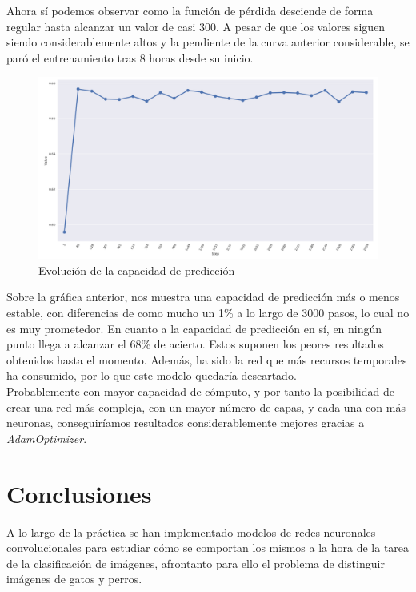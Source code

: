 \documentclass[11pt]{article}
\theoremstyle{plain}
\theoremstyle{definition}
\begin{document}
Ahora sí podemos observar como la función de pérdida desciende de 
forma regular hasta alcanzar un valor de casi 300. A pesar de que
los valores siguen siendo considerablemente altos y la pendiente
de la curva anterior considerable, se paró el entrenamiento tras
8 horas desde su inicio.

\begin{figure}[H]
  \centering
  \includegraphics[width=.95\textwidth]{imgs/accuracy_adam}
  \caption{Evolución de la capacidad de predicción}
\end{figure}

Sobre la gráfica anterior, nos muestra una capacidad de predicción
más o menos estable, con diferencias de como mucho un 1\% a lo largo de 
3000 pasos, lo cual no es muy prometedor. En cuanto a la capacidad de
predicción en sí, en ningún punto llega a alcanzar el 68\% de acierto.
Estos suponen los peores resultados obtenidos hasta el momento. Además,
ha sido la red que más recursos temporales ha consumido, por lo que
este modelo quedaría descartado. \\

Probablemente con mayor capacidad de cómputo, y por tanto la posibilidad
de crear una red más compleja, con un mayor número de capas, y cada una 
con más neuronas, conseguiríamos resultados considerablemente mejores
gracias a \textit{AdamOptimizer}.

\section{Conclusiones}

A lo largo de la práctica se han implementado modelos de redes
neuronales convolucionales para estudiar cómo se comportan los mismos
a la hora de la tarea de la clasificación de imágenes, afrontanto para
ello el problema de distinguir imágenes de gatos y perros.\\
\end{document}
